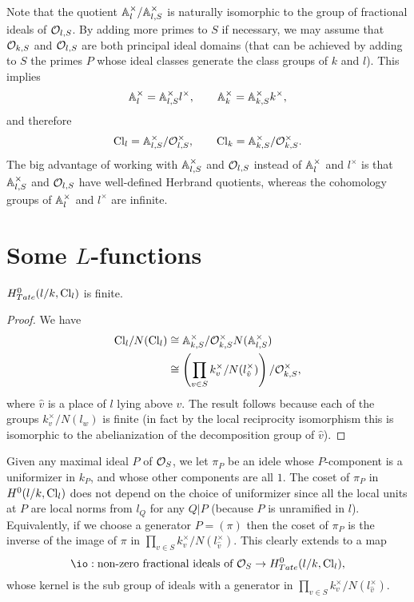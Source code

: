 Note that the quotient ${\mathbb A}_l^\times / {\mathbb A}_{l,S}^\times$ is naturally isomorphic to the
group of fractional ideals of ${\mathcal O}_{l,S}$.
By adding more primes to $S$ if necessary, we may assume that ${\mathcal O}_{k,S}$ and ${\mathcal O}_{l,S}$ are both
principal ideal domains (that can be achieved by adding to $S$ the primes $P$ whose ideal classes
generate the class groups of $k$ and $l$).
This implies
\[
	{\mathbb A}_{l}^\times = {\mathbb A}_{l,S}^\times l^\times,
	\qquad
	{\mathbb A}_k^\times = {\mathbb A}_{k,S}^\times k^\times,
\]
and therefore
\[
	\mathrm{Cl}_{l} = {\mathbb A}_{l,S}^\times / {\mathcal O}_{l,S}^\times, \qquad
	\mathrm{Cl}_{k} = {\mathbb A}_{k,S}^\times / {\mathcal O}_{k,S}^\times.
\]
The big advantage of working with ${\mathbb A}_{l,S}^\times$ and ${\mathcal O}_{l,S}$ instead of ${\mathbb A}_l^\times$ and
$l^\times$ is that ${\mathbb A}_{l,S}^\times$ and ${\mathcal O}_{l,S}$ have well-defined Herbrand quotients,
whereas the cohomology groups of ${\mathbb A}_l^\times$ and $l^\times$ are infinite.


\section{Some $L$-functions}

\begin{lemma}
	$H^0_{Tate}(l/k,\mathrm{Cl}_l)$ is finite.
\end{lemma}

\begin{proof}
	We have
	\begin{align*}
		\mathrm{Cl}_{l} / N(\mathrm{Cl}_l)
		& \cong {\mathbb A}_{k,S}^\times / {\mathcal O}_{k,S}^\times N({\mathbb A}_{l,S}^\times) \\
		& \cong \left(\prod_{v \in S} k_v^\times / N(l_{\hat v}^\times)\right) / {\mathcal O}_{k,S}^\times,
	\end{align*}
	where $\hat v$ is a place of $l$ lying above $v$.
	The result follows because each of the groups $k_v^\times / N(l_w)$ is finite
	(in fact by the local reciprocity isomorphism this is isomorphic to the abelianization of the
	decomposition group of $\hat v$).
\end{proof}

Given any maximal ideal $P$ of ${\mathcal O}_S$, we let $\pi_P$ be an idele whose
$P$-component is a uniformizer in $k_P$, and whose other components are all $1$.
The coset of $\pi_P$ in $H^0(l/k,\mathrm{Cl}_l)$ does not depend on the choice of uniformizer since
all the local units at $P$ are local norms from $l_{Q}$ for any $Q|P$
(because $P$ is unramified in $l$).
Equivalently, if we choose a generator $P=(\pi)$ then the coset of $\pi_P$ is the inverse of
the image of $\pi$ in $\prod_{v \in S} k_v^\times / N(l_{\hat v}^\times)$.
This clearly extends to a map
\[
	\io : \textrm{non-zero fractional ideals of $\cO_S$}
	\to
	H^0_{Tate}(l/k,\Cl_l),
\]
whose kernel is the sub group of ideals with a generator in
$\prod_{v \in S} k_v^\times / N(l_{\hat v}^\times)$.

